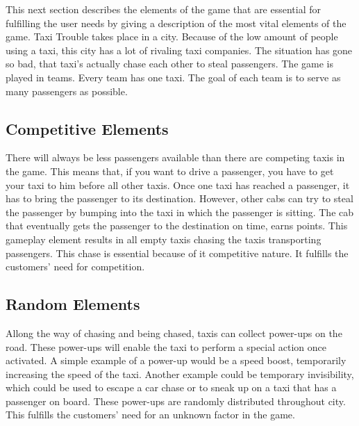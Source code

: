 

This next section describes the elements of the game that are essential for fulfilling the user needs by giving a description of the most vital elements of the game. Taxi Trouble takes place in a city. Because of the low amount of people using a taxi, this city has a lot of rivaling taxi companies. The situation has gone so bad, that taxi's actually chase each other to steal passengers. The game is played in teams. Every team has one taxi. The goal of each team is to serve as many passengers as possible.


\subsection{Competitive Elements}
There will always be less passengers available than there are competing taxis in the game. This means that, if you want to drive a passenger, you have to get your taxi to him before all other taxis. Once one taxi has reached a passenger, it has to bring the passenger to its destination. However, other cabs can try to steal the passenger by bumping into the taxi in which the passenger is sitting. The cab that eventually gets the passenger to the destination on time, earns points. This gameplay element results in all empty taxis chasing the taxis transporting passengers. This chase is essential because of it competitive nature. It fulfills the customers' need for competition. 

\subsection{Random Elements}

Allong the way of chasing and being chased, taxis can collect power-ups on the road. These power-ups will enable the taxi to perform a special action once activated. A simple example of a power-up would be a speed boost, temporarily increasing the speed of the taxi. Another example could be temporary invisibility, which could be used to escape a car chase or to sneak up on a taxi that has a passenger on board. These power-ups are randomly distributed throughout city. This fulfills the customers' need for an unknown factor in the game. 

